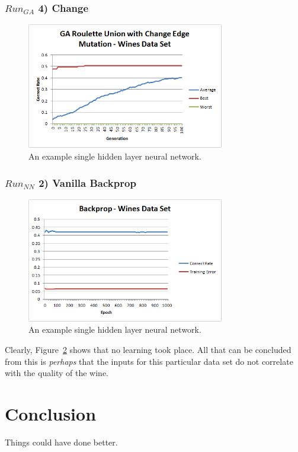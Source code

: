 \documentclass[journal]{IEEEtran}
\begin{document}
    \subsubsection*{$Run_{GA}$ 4) Change}
      \begin{figure}[here]%
        \centering
        \includegraphics[width=3.4in]{wine_change_edge}
        \caption{An example single hidden layer neural network.}
        \label{fig:wine_change_edge}
      \end{figure}

    \subsubsection{$Run_{NN}$ 2) Vanilla Backprop}
      \begin{figure}[here]%
        \centering
        \includegraphics[width=3.4in]{brain_wine}
        \caption{An example single hidden layer neural network.}
        \label{fig:brain_wine}
      \end{figure}
    Clearly, Figure~\ref{fig:brain_wine} shows that no learning took place. All that can be concluded from this
    is \textit{perhaps} that the inputs for this particular data set do not correlate with the quality of the wine.

\section{Conclusion}
Things could have done better.
\end{document}
